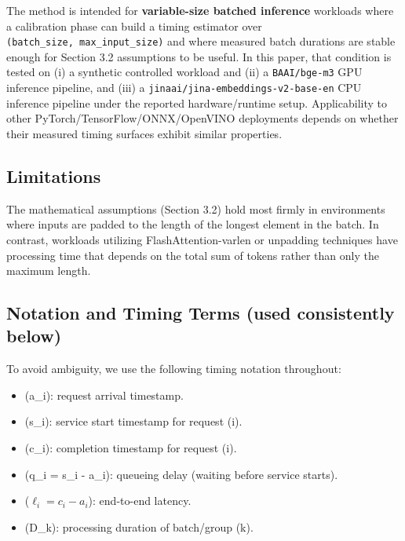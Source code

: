 \documentclass{article}
\providecommand{\tightlist}{\setlength{\itemsep}{0pt}\setlength{\parskip}{0pt}}
\begin{document}
The method is intended for \textbf{variable-size batched inference}
workloads where a calibration phase can build a timing estimator over
\texttt{(batch\_size,\ max\_input\_size)} and where measured batch
durations are stable enough for Section 3.2 assumptions to be useful. In
this paper, that condition is tested on (i) a synthetic controlled
workload and (ii) a \texttt{BAAI/bge-m3} GPU inference pipeline, and
(iii) a \texttt{jinaai/jina-embeddings-v2-base-en} CPU inference
pipeline under the reported hardware/runtime setup. Applicability to
other PyTorch/TensorFlow/ONNX/OpenVINO deployments depends on whether
their measured timing surfaces exhibit similar properties.

\hypertarget{34-limitations}{%
\subsection{Limitations}\label{34-limitations}}

The mathematical assumptions (Section 3.2) hold most firmly in
environments where inputs are padded to the length of the longest
element in the batch. In contrast, workloads utilizing
FlashAttention-varlen or unpadding techniques have processing time that
depends on the total sum of tokens rather than only the maximum length.

\hypertarget{35-notation-and-timing-terms-used-consistently-below}{%
\subsection{Notation and Timing Terms (used consistently
below)}\label{35-notation-and-timing-terms-used-consistently-below}}

To avoid ambiguity, we use the following timing notation throughout:

\begin{itemize}
\tightlist
\item
  (a\_i): request arrival timestamp.
\item
  (s\_i): service start timestamp for request (i).
\item
  (c\_i): completion timestamp for request (i).
\item
  (q\_i = s\_i - a\_i): queueing delay (waiting before service starts).
\item
  (\(\ell_i = c_i - a_i\)): end-to-end latency.
\item
  (D\_k): processing duration of batch/group (k).
\end{itemize}
\end{document}
